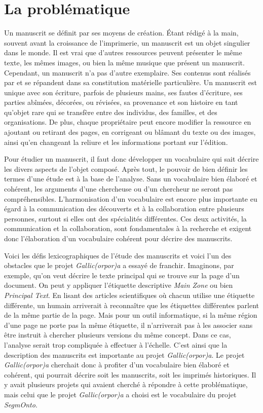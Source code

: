 \documentclass[class=article, crop=false]{standalone}
\begin{document}
	
\section{La problématique}
Un manuscrit se définit par ses moyens de création. Étant rédigé à la main, souvent avant la croissance de l'imprimerie, un manuscrit est un objet singulier dans le monde. Il est vrai que d'autres ressources peuvent présenter le même texte, les mêmes images, ou bien la même musique que présent un manuscrit. Cependant, un manuscrit n'a pas d'autre exemplaire. Ses contenus sont réalisés par et se répandent dans sa constitution matérielle particulière. Un manuscrit est unique avec son écriture, parfois de plusieurs mains, ses fautes d'écriture, ses parties abîmées, décorées, ou révisées, sa provenance et son histoire en tant qu'objet rare qui se transfère entre des individus, des familles, et des organisations. De plus, chaque propriétaire peut encore modifier la ressource en ajoutant ou retirant des pages, en corrigeant ou blâmant du texte ou des images, ainsi qu'en changeant la reliure et les informations portant sur l'édition.

Pour étudier un manuscrit, il faut donc développer un vocabulaire qui sait décrire les divers aspects de l'objet composé. Après tout, le pouvoir de bien définir les termes d'une étude est à la base de l'analyse. Sans un vocabulaire bien élaboré et cohérent, les arguments d'une chercheuse ou d'un chercheur ne seront pas compréhensibles. L'harmonisation d'un vocabulaire est encore plus importante eu égard à la communication des découverts et à la collaboration entre plusieurs personnes, surtout si elles ont des spécialités différentes. Ces deux activités, la communication et la collaboration, sont fondamentales à la recherche et exigent donc l'élaboration d'un vocabulaire cohérent pour décrire des manuscrits.

Voici les défis lexicographiques de l'étude des manuscrits et voici l'un des obstacles que le projet \textit{Gallic(orpor)a} a essayé de franchir. Imaginons, par exemple, qu'on veut décrire le texte principal qui se trouve sur la page d'un document. On peut y appliquer l'étiquette descriptive \textit{Main Zone} ou bien \textit{Principal Text}. En lisant des articles scientifiques où chacun utilise une étiquette différente, un humain arriverait à reconnaître que les étiquettes différentes parlent de la même partie de la page. Mais pour un outil informatique, si la même région d'une page ne porte pas la même étiquette, il n'arriverait pas à les associer sans être instruit à chercher plusieurs versions du même concept. Dans ce cas, l'analyse serait trop compliquée à effectuer à l'échelle. C'est ainsi que la description des manuscrits est importante au projet \textit{Gallic(orpor)a}. Le projet \textit{Gallic(orpor)a} cherchait donc à profiter d'un vocabulaire bien élaboré et cohérent, qui pourrait décrire soit les manuscrits, soit les imprimés historiques. Il y avait plusieurs projets qui avaient cherché à répondre à cette problématique, mais celui que le projet \textit{Gallic(orpor)a} a choisi est le vocabulaire du projet \textit{SegmOnto}.
\end{document}
